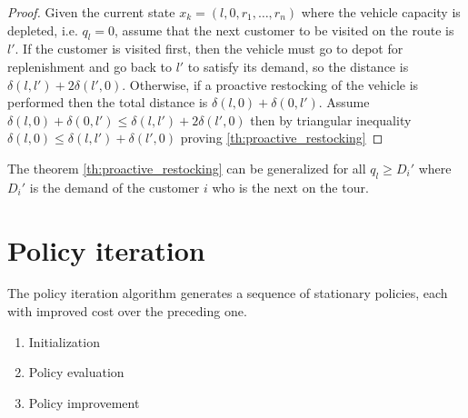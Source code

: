 \begin{proof}
Given the current state $x_k=(l,0,r_1,\ldots, r_n)$ where the vehicle capacity is depleted, i.e. $q_l = 0$, assume that the next customer to be visited on the route is $l'$. If the customer is visited first, then the vehicle must go to depot for replenishment and go back to $l'$ to satisfy its demand, so the distance is $\delta(l,l')+2\delta(l',0)$. Otherwise, if a proactive restocking of the vehicle is performed then the total distance is $\delta(l,0)+\delta(0,l')$.
Assume $\delta(l,0)+\delta(0,l') \leq \delta(l,l')+2\delta(l',0)$ then by triangular inequality $\delta(l,0) \leq \delta(l,l')+\delta(l',0)$ proving \ref{th:proactive_restocking}
\end{proof}

\begin{lemma}%
 The theorem \ref{th:proactive_restocking} can be generalized for all $q_l \geq D_i'$ where $D_i'$ is the demand of the customer $i$ who is the next on the tour.
\end{lemma}











\section{Policy iteration}

The policy iteration algorithm generates a sequence of stationary policies, each with improved cost over the preceding one.

\begin{enumerate}
 \item Initialization
 \item Policy evaluation
 \item Policy improvement
\end{enumerate}

